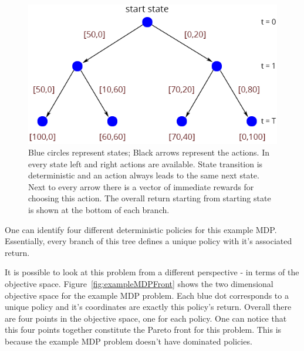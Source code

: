 \begin{figure}[ht]
\centering
\includegraphics[scale=0.6]{decisionTree.png}
\caption{Blue circles represent states; Black arrows represent the actions. In every state left and right actions are available. State transition is deterministic and an action always leads to the same next state. Next to every arrow there is a vector of immediate rewards for choosing this action. The overall return starting from starting state is shown at the bottom of each branch.}
\label{fig:decisionTree}
\end{figure}

One can identify four different deterministic policies for this example MDP. Essentially, every branch of this tree defines a unique policy with it's associated return.

It is possible to look at this problem from a different perspective - in terms of the objective space. Figure~\ref{fig:exampleMDPFront} shows the two dimensional objective space for the example MDP problem. Each blue dot corresponds to a unique policy and it's coordinates are exactly this policy's return. Overall there are four points in the objective space, one for each policy. One can notice that this four points together constitute the Pareto front for this problem. This is because the example MDP problem doesn't have dominated policies.\\


